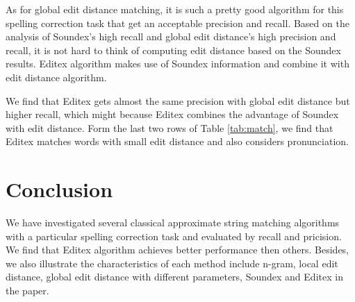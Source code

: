 \documentclass[11pt]{article}
\begin{document}
As for global edit distance matching, it is such a pretty good algorithm for this spelling correction task that get an acceptable precision and recall. Based on the analysis of Soundex's high recall and global edit distance's high precision and recall, it is not hard to think of computing edit distance based on the Soundex results. Editex algorithm makes use of Soundex information and combine it with edit distance algorithm. 

We find that Editex gets almost the same precision with global edit distance but higher recall, which might because Editex combines the advantage of Soundex with edit distance. Form the last two rows of Table \ref{tab:match}, we find that Editex matches words with small edit distance and also considers pronunciation. 


\section{Conclusion}

We have investigated several classical approximate string matching algorithms with a particular spelling correction task and evaluated by recall and pricision. We find that Editex algorithm achieves better performance then others. Besides,  we also illustrate the characteristics of each method include n-gram, local edit distance, global edit distance with different parameters, Soundex and Editex in the paper. 




\end{document}
